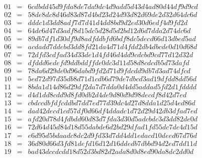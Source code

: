 \begin{multicols}{2}
\[\begin{array}{rcl}
01 &=& 6cdbdd45d9fda8de7da9dc4d9add5d43d4ad80d44df9d9cd \\
02 &=& 58de8dc8d46d83d87d4bd23d24d93d82d69de2d32d64dc6d \\
03 &=& dddc1d3dd8adf7d7d41d4dd8bd9d2ed30d6edf4d9fd2d \\
04 &=& 64dc6d47d3adf8d15dc5d28d5d2bd12d6d7dda2d74dc6d \\
05 &=& 89db7df1d30df9d8adfddbfd6bdf8dc5decd66d13dbed5ad \\
06 &=& acdadd7ddebd3dd8fd21da4d71d4fdd2db4dbcde0d10d68d \\
07 &=& 72dfd3cdfad34d33de1d4fd46d4dd9cdcbd9cd77d12d32d \\
08 &=& dfddd6edefd9ddbddffde0dc3d11d58d8cdcdb5d73dafd \\
09 &=& 78da6d29de0d96dabd9fd2d71d9fdcdd9db7d3ad74dfcd \\
10 &=& 5ed72d97d35db8d71d1cdb6d79de7dbcd3ad19dfdd8dd56d \\
11 &=& 8bda1d14d86d29df2da7d7dda0d4dd5addad5fd2d1fdddd \\
12 &=& d4d1dd8cdd9d8fd0db2d4de9d80d9d98decdf8d42d7ed \\
13 &=& cbdccdbfdfcddbd7dd7ed77d39dc4d27d8dda1d25d4ed86d \\
14 &=& dad42decd1cd57df0d66df4ddadc1d72d29d42db3dfad7ed \\
15 &=& afd20d78d4fdbdd60d83d7fda3d30d5adcbdc3d3dd82de0d \\
16 &=& 72d64d45d84d18d55dabde6d2bd29dfad1fd55dc7de4d15d \\
17 &=& e6d95d5bdaadc8dc2d9fd33d7dd4dd1edacd10deed67d76d \\
18 &=& 36d80d66d3fd81defd16d12d16ddedb7dbbd94d2ed7dd11d \\
19 &=& bad43dccdcdd18d52d3bd82d2ada8d0d8ed90da8dc2dd0d \\


\end{array}\]
\end{multicols}
